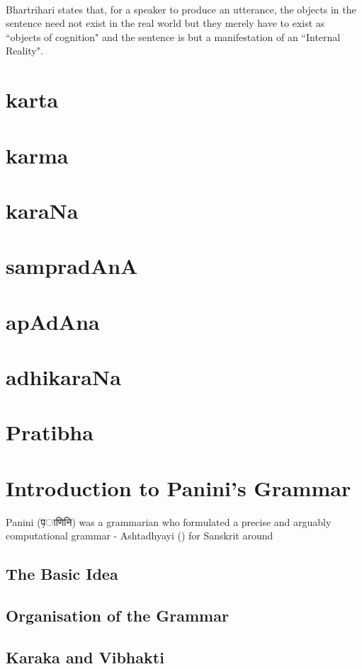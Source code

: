 \documentclass[a4paper,10pt]{article}
\begin{document}
\paragraph{} Bhartrihari states that, for a speaker to produce an utterance, the objects in the sentence need not 
exist in the real world but they merely have to exist as ``objects of cognition" and the sentence is but a manifestation of an ``Internal Reality".

\newpage
\section{karta} 
\newpage
\section{karma}
\newpage
\section{karaNa}
\newpage
\section{sampradAnA}
\newpage
\section{apAdAna}
\newpage
\section{adhikaraNa}
\newpage
\section{Pratibha}


\newpage
\section{Introduction to Panini's Grammar}
Panini ({\d पाणिनि}) was a grammarian who formulated a precise and arguably computational grammar - Ashtadhyayi () for Sanskrit around 
\subsection{The Basic Idea}
\subsection{Organisation of the Grammar}
\subsection{Karaka and Vibhakti}
\end{document}
